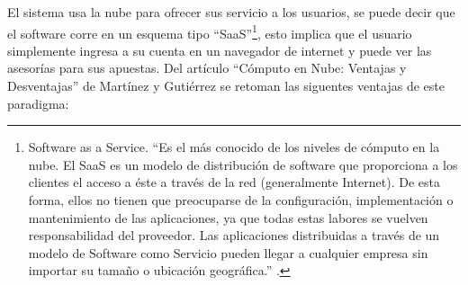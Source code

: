 El sistema usa la nube para ofrecer sus servicio a los usuarios, se puede decir que el software corre en un esquema tipo ``SaaS''\footnote{Software as a Service. ``Es el más conocido de los niveles de cómputo en la nube. El SaaS es un modelo de distribución de software que proporciona a los clientes el acceso a éste a través de la red (generalmente Internet). De esta forma, ellos no tienen que preocuparse de la configuración, implementación o mantenimiento de las aplicaciones, ya que todas estas labores se vuelven responsabilidad del proveedor. Las aplicaciones distribuidas a través de un modelo de Software como Servicio pueden llegar a cualquier empresa sin importar su tamaño o ubicación geográfica.'' \cite{computoNube}.}, esto implica que el usuario simplemente ingresa a su cuenta en un navegador de internet y puede ver las asesorías para sus apuestas.
Del artículo ``Cómputo en Nube: Ventajas y Desventajas'' de Martínez y Gutiérrez \cite{computoNube}  se retoman las siguentes ventajas de este paradigma:
